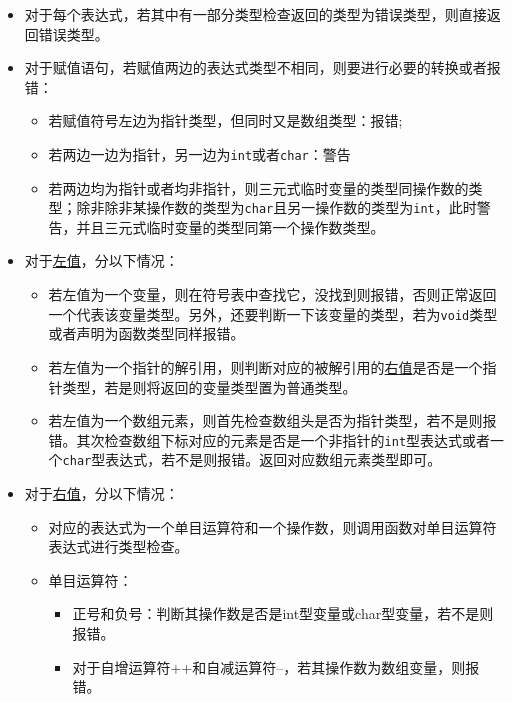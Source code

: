 \begin{itemize}
\item 对于每个表达式，若其中有一部分类型检查返回的类型为错误类型，则直接返回错误类型。
\item 对于赋值语句，若赋值两边的表达式类型不相同，则要进行必要的转换或者报错：
	\begin{itemize}
  		\item 若赋值符号左边为指针类型，但同时又是数组类型：报错;
  		\item 若两边一边为指针，另一边为\lstinline|int|或者\lstinline|char|：警告
  		\item 若两边均为指针或者均非指针，则三元式临时变量的类型同操作数的类型；除非除非某操作数的类型为\lstinline|char|且另一操作数的类型为\lstinline|int|，此时警告，并且三元式临时变量的类型同第一个操作数类型。
  	\end{itemize}
\item 对于\hyperref[lrvalue]{左值}，分以下情况：
	\begin{itemize}
		\item 若左值为一个变量，则在符号表中查找它，没找到则报错，否则正常返回一个代表该变量类型。另外，还要判断一下该变量的类型，若为\lstinline|void|类型或者声明为函数类型同样报错。
		\item 若左值为一个指针的解引用，则判断对应的被解引用的\hyperref[lrvalue]{右值}是否是一个指针类型，若是则将返回的变量类型置为普通类型。
		\item 若左值为一个数组元素，则首先检查数组头是否为指针类型，若不是则报错。其次检查数组下标对应的元素是否是一个非指针的\lstinline|int|型表达式或者一个\lstinline|char|型表达式，若不是则报错。返回对应数组元素类型即可。
	\end{itemize}
\item 对于\hyperref[lrvalue]{右值}，分以下情况：
	\begin{itemize}
		\item 对应的表达式为一个单目运算符和一个操作数，则调用函数对单目运算符表达式进行类型检查。
		\item 单目运算符：
		\begin{itemize}
			\item 正号和负号：判断其操作数是否是int型变量或char型变量，若不是则报错。
			\item 对于自增运算符++和自减运算符--，若其操作数为数组变量，则报错。
		\end{itemize}


\end{itemize}
\end{itemize}
